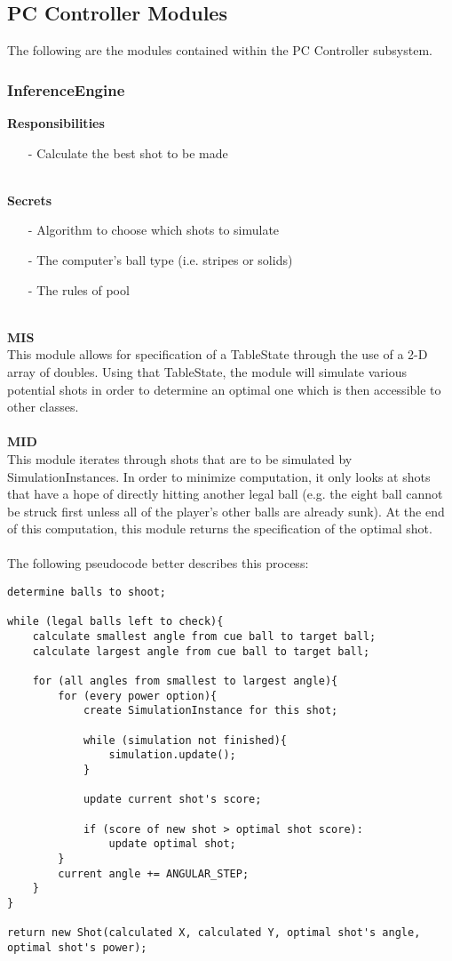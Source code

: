 \documentclass[titlepage]{article}
\begin{document}
\subsection{PC Controller Modules}
The following are the modules contained within the PC Controller subsystem.
\subsubsection{InferenceEngine}
\textbf{Responsibilities}
\begin{itemize}
	\item[-] Calculate the best shot to be made
\end{itemize}~\\
\textbf{Secrets}
\begin{itemize}
	\item[-] Algorithm to choose which shots to simulate
	\item[-] The computer's ball type (i.e. stripes or solids)
	\item[-] The rules of pool
\end{itemize}~\\
\textbf{MIS}\\[2mm]
This module allows for specification of a TableState through the use of a 2-D array of doubles. Using that TableState, the module will simulate various potential shots in order to determine an optimal one which is then accessible to other classes.
\\\\
\textbf{MID}\\[2mm]
This module iterates through shots that are to be simulated by SimulationInstances. In order to minimize computation, it only looks at shots that have a hope of directly hitting another legal ball (e.g. the eight ball cannot be struck first unless all of the player's other balls are already sunk). At the end of this computation, this module returns the specification of the optimal shot.\\~\\
The following pseudocode better describes this process:
\begin{lstlisting}
determine balls to shoot;

while (legal balls left to check){
	calculate smallest angle from cue ball to target ball;
	calculate largest angle from cue ball to target ball;
	
	for (all angles from smallest to largest angle){
		for (every power option){
			create SimulationInstance for this shot;
			
			while (simulation not finished){
				simulation.update();
			}
			
			update current shot's score;
			
			if (score of new shot > optimal shot score):
				update optimal shot;
		}		
		current angle += ANGULAR_STEP;
	}
}

return new Shot(calculated X, calculated Y, optimal shot's angle, optimal shot's power);
\end{lstlisting}
\newpage
\end{document}

